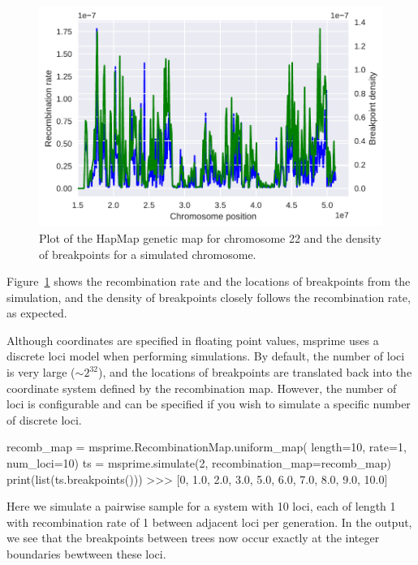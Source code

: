 \documentclass[graybox]{svmult}
\newcommand{\includenbimage}[1]{\begin{center}\texttt{[image: \#1]}\end{center}}
\begin{document}
\begin{figure}
\begin{center}
\includegraphics[width=\textwidth]{images/simulations_53_0.pdf}
\end{center}
\caption{\label{fig:variable_recombination}Plot of the HapMap
genetic map for chromosome 22 and the density of breakpoints for a
simulated chromosome.}
\end{figure}


Figure~\ref{fig:variable_recombination} shows the
recombination rate and the locations of breakpoints
from the simulation, and the density of breakpoints closely follows the
recombination rate, as expected.

Although coordinates are specified in floating point values, msprime
uses a discrete loci model when performing simulations. By default, the
number of loci is very large (\(\sim 2^{32}\)), and the locations of
breakpoints are translated back into the coordinate system defined by
the recombination map. However, the number of loci is configurable and
can be specified if you wish to simulate a specific number of discrete
loci.

\begin{pythoncode}
recomb_map = msprime.RecombinationMap.uniform_map(
    length=10, rate=1, num_loci=10)
ts = msprime.simulate(2, recombination_map=recomb_map)
print(list(ts.breakpoints()))
>>> [0, 1.0, 2.0, 3.0, 5.0, 6.0, 7.0, 8.0, 9.0, 10.0]
\end{pythoncode}

    Here we simulate a pairwise sample for a system with 10 loci, each of
length 1 with recombination rate of 1 between adjacent loci per
generation. In the output, we see that the breakpoints between trees now
occur exactly at the integer boundaries bewtween these loci.
\end{document}
